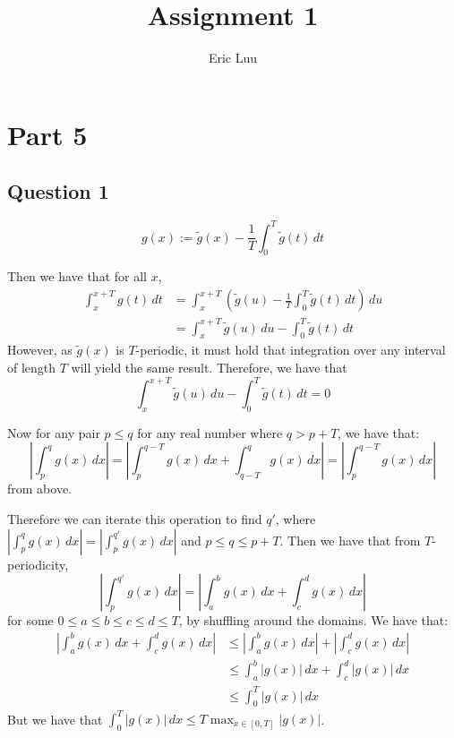 \documentclass{article}
\title{Assignment 1}
\author{Eric Luu}
\theoremstyle{definition}
\numberwithin{theorem}{section}
\numberwithin{equation}{section}
\begin{document}
\maketitle
\section{Part 5}
\subsection{Question 1}


\begin{equation}
	g(x) := \tilde{g}(x) - \frac{1}{T} \int_{0}^{T} \tilde{g}(t) \, dt
\end{equation}

Then we have that for all $x$,
\begin{align*}
	\int_{x}^{x + T} g(t) \, dt &= \int_{x}^{x + T} \left(\tilde{g}(u) - \frac{1}{T} \int_{0}^{T} \tilde{g}(t) \, dt\right) \, du\\
	&= \int_{x}^{x + T} \tilde{g}(u)\, du - \int_{0}^{T} \tilde{g}(t) \, dt
\end{align*}
However, as $\tilde{g}(x)$ is $T$-periodic, it must hold that integration over any interval of length $T$ will yield the same result. Therefore, we have that
\begin{equation}
	\int_{x}^{x + T} \tilde{g}(u)\, du - \int_{0}^{T} \tilde{g}(t) \, dt = 0
\end{equation}

Now for any pair $p \leq q$ for any real number where $q > p + T$, we have that:
\begin{equation}
	\left| \int_{p}^{q} g(x) \, dx \right| = \left| \int_{p}^{q-T} g(x) \, dx +  \int_{q - T}^{q} g(x) \, dx\right| = \left| \int_{p}^{q-T} g(x) \, dx  \right|
\end{equation}
from above.

Therefore we can iterate this operation to find $q'$, where $\left| \int_{p}^{q} g(x) \, dx \right| = \left| \int_{p}^{q'} g(x) \, dx \right|$ and $p \leq q \leq p + T$. Then we have that from $T$-periodicity,
\begin{equation}
	\left| \int_{p}^{q'} g(x) \, dx \right| = \left| \int_{a}^{b} g(x) \, dx + \int_{c}^{d} g(x) \, dx \right|
\end{equation}
for some $ 0 \leq a \leq b \leq c \leq d \leq T$, by shuffling around the domains. We have that:
\begin{align*}
	\left| \int_{a}^{b} g(x) \, dx + \int_{c}^{d} g(x) \, dx \right| &\leq \left| \int_{a}^{b} g(x) \, dx \right| + \left| \int_{c}^{d} g(x) \, dx \right|\\
	&\leq  \int_{a}^{b} |g(x)| \, dx +\int_{c}^{d} |g(x)| \, dx\\
	&\leq \int_{0}^T |g(x)| \, dx
\end{align*}
But we have that $\int_{0}^T |g(x)| \, dx \leq T \max_{x \in [0, T]} |g(x)|$.
\end{document}
